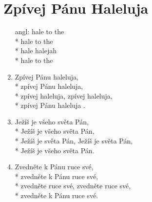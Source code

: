 \section{Zpívej Pánu Haleluja}
\begin{enumerate}
\item[angl:]	 hale to the  \\*
	 hale to the \\*
	 hale  halejah\\*
	 hale to the  

\item	Zpívej Pánu haleluja,\\*
	zpívej Pánu haleluja,\\*
	zpívej haleluja, zpívej haleluja,\\*
	zpívej Pánu haleluja .

\item	Ježíš je všeho světa Pán,\\*
	Ježíš je všeho světa Pán,\\*
	Ježíš je světa Pán, Ježíš je světa Pán,	\\*
	Ježíš je všeho světa Pán.

\item	Zvedněte k Pánu ruce své,\\*
	zvedněte k Pánu ruce své,\\*
	zvedněte ruce své, zvedněte ruce své,\\*
	zvedněte k Pánu ruce své.

\end{enumerate}
